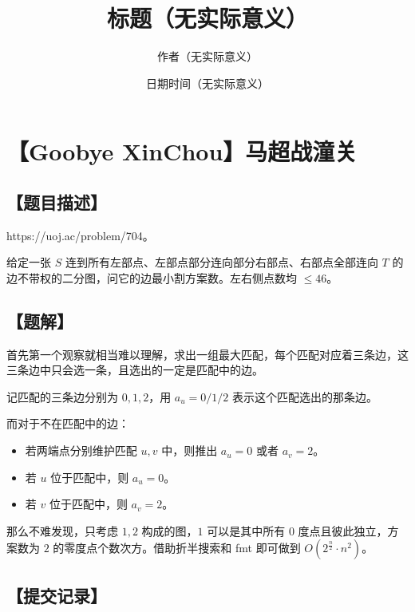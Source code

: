 \documentclass[UTF8,12pt,a4paper]{ctexart}
\title{标题（无实际意义）}
\author{作者（无实际意义）}
\date{日期时间（无实际意义）}
\begin{document}
	\fontsize{12pt}{12pt}\selectfont
	
	\newpage
	\pagestyle{fancy}
	
	
	
	\section*{【Goobye XinChou】马超战潼关}
	
	\subsection*{【题目描述】}
	
	https://uoj.ac/problem/704。
	
	给定一张 $S$ 连到所有左部点、左部点部分连向部分右部点、右部点全部连向 $T$ 的边不带权的二分图，问它的边最小割方案数。左右侧点数均 $\le 46$。
	
	\subsection*{【题解】}
	
	首先第一个观察就相当难以理解，求出一组最大匹配，每个匹配对应着三条边，这三条边中只会选一条，且选出的一定是匹配中的边。
	
	记匹配的三条边分别为 $0,1,2$，用 $a_u=0/1/2$ 表示这个匹配选出的那条边。
	
	而对于不在匹配中的边：
	
	\begin{itemize}
		\item 若两端点分别维护匹配 $u,v$ 中，则推出 $a_u=0$ 或者 $a_v=2$。
		\item 若 $u$ 位于匹配中，则 $a_u=0$。
		\item 若 $v$ 位于匹配中，则 $a_v=2$。
	\end{itemize}

	那么不难发现，只考虑 $1,2$ 构成的图，$1$ 可以是其中所有 $0$ 度点且彼此独立，方案数为 $2$ 的零度点个数次方。借助折半搜索和 fmt 即可做到 $O(2^{\frac n2}\cdot n^2)$。
	
	\subsection*{【提交记录】}
	
\end{document}
